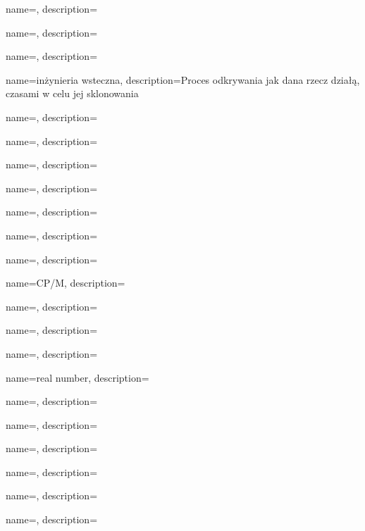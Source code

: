 {
  name={\PLph},
  description={\PLph}
}

{
  name={\PLph},
  description={\PLph}
}

{
  name={\PLph},
  description={\PLph}
}

{
  name={inżynieria wsteczna},
  description={Proces odkrywania jak dana rzecz działą, czasami w celu jej sklonowania  }
}

{
  name={\PLph},
  description={\PLph}
}

{
  name={\PLph},
  description={\PLph}
}

{
  name={\PLph},
  description={\PLph}
}

{
  name={\PLph},
  description={\PLph}
}

{
  name={\PLph},
  description={\PLph}
}

{
  name={\PLph},
  description={\PLph}
}

{
  name={\PLph},
  description={\PLph}
}

{
  name=CP/M,
  description={\PLph}
}

{
  name={\PLph},
  description={\PLph}
}

{
  name={\PLph},
  description={\PLph}
}

{
  name={\PLph},
  description={\PLph}
}

{
  name={real number},
  description={\PLph}
}

{
  name={\PLph},
  description={\PLph}
}

{
  name={\PLph},
  description={\PLph}
}

{
  name={\PLph},
  description={\PLph}
}

{
  name={\PLph},
  description={\PLph}
}

{
  name={\PLph},
  description={\PLph}
}

{
  name={\PLph},
  description={\PLph}
}

